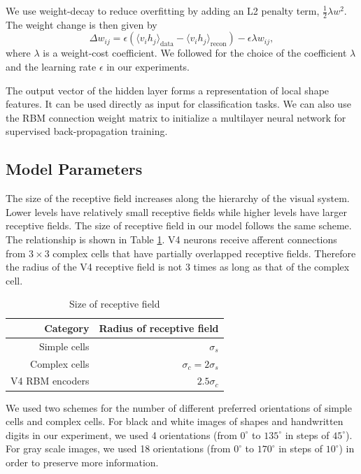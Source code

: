 \documentclass[5p]{elsarticle}
\begin{document}
We use weight-decay \cite{hinton2010}
to reduce overfitting by adding an L2 penalty term, $\frac{1}{2}\lambda w^2$.
The weight change is then given by
\begin{equation}
\Delta w_{ij}=\epsilon\left(\langle v_i h_j\rangle_\text{data}-\langle v_i h_j\rangle_\text{recon}\right)
-\epsilon\lambda w_{ij},
\end{equation}
where $\lambda$ is a weight-cost coefficient.
We followed \cite{hinton2010} for the choice of the coefficient $\lambda$ and the learning rate $\epsilon$
in our experiments.

The output vector of the hidden layer forms a representation of local shape features.
It can be used directly as input for classification tasks.
We can also use the RBM connection weight matrix to initialize a multilayer neural network
for supervised back-propagation training.

\subsection{Model Parameters}

The size of the receptive field increases along the hierarchy of the visual system.
Lower levels have relatively small receptive fields while higher levels have larger receptive fields.
The size of receptive field in our model follows the same scheme.
The relationship is shown in Table \ref{tab:1}.
V4 neurons receive afferent connections from $3\times3$ complex cells
that have partially overlapped receptive fields.
Therefore the radius of the V4 receptive field is not 3 times as long as that of the complex cell.

\begin{table}[h]
\caption{Size of receptive field}
\centering
\begin{tabular}{rr}
\toprule
Category & Radius of receptive field \\
\midrule
Simple cells & $\sigma_s$ \\
Complex cells & $\sigma_c = 2\sigma_s$ \\
V4 RBM encoders & $2.5\sigma_c$\\
\bottomrule
\end{tabular}
\label{tab:1}
\end{table}

We used two schemes for the number of different preferred orientations of simple cells and complex cells.
For black and white images of shapes and handwritten digits in our experiment,
we used 4 orientations (from $0^\circ$ to $135^\circ$ in steps of $45^\circ$).
For gray scale images, we used 18 orientations (from $0^\circ$ to $170^\circ$ in steps of $10^\circ$)
in order to preserve more information.
\end{document}
